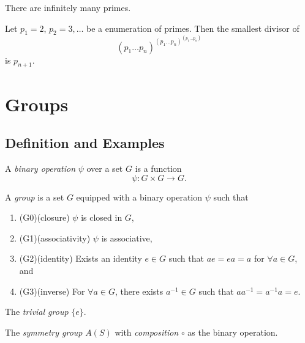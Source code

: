 
\begin{corollary}
	There are infinitely many primes.
\end{corollary}

\begin{proposition}
	Let $p_1 = 2$, $p_2 = 3, \ldots$ be a enumeration of primes. Then the smallest divisor of \[
		\left( p_1\ldots p_n \right) ^{\left( p_1 \ldots p_n \right) ^{\left( p_1 \ldots p_n \right) }}
	\] is $p_{n+1}$.
\end{proposition}

\section{Groups}
\subsection{Definition and Examples}

\begin{definition}
	A \textit{binary operation} $\psi$ over a set $G$ is a function \[
	\psi : G \times  G \to  G
	.\] 
\end{definition}

\begin{definition}[Group]
	A \textit{group} is a set $G$ equipped with a binary operation $\psi$ such that 
	\begin{enumerate}
		\item (G0)(closure) $\psi$ is closed in $G$,
		\item (G1)(associativity) $\psi$ is associative,
		\item (G2)(identity) Exists an identity $e \in G$ such that $ae = ea = a$ for $\forall a \in G$, and
		\item (G3)(inverse) For $\forall a \in G$, there exists $a^{-1} \in G$ such that $a a^{-1} = a^{-1} a = e$.
	\end{enumerate}
\end{definition}

\begin{example}
	The \textit{trivial group} $\{e\} $.
\end{example}

\begin{example}
	The \textit{symmetry group} $A(S)$ with \textit{composition} $\circ$ as the binary operation.
\end{example}

